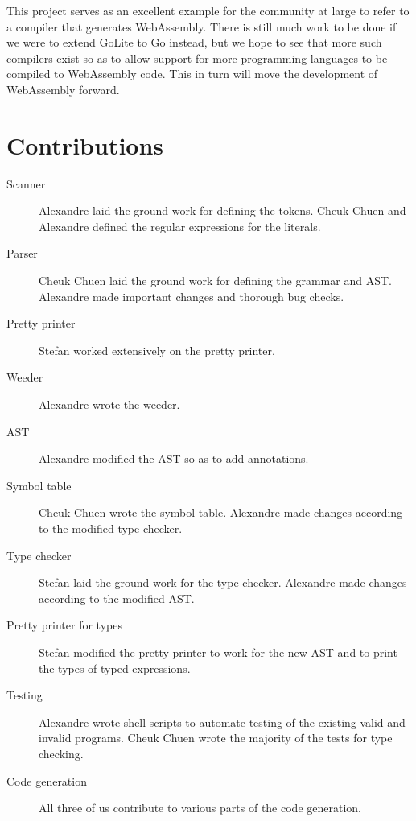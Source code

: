 \documentclass{article}
\begin{document}
This project serves as an excellent example for the community at large to refer to a compiler that generates WebAssembly. There is still much work to be done if we were to extend GoLite to Go instead, but we hope to see that more such compilers exist so as to allow support for more programming languages to be compiled to WebAssembly code. This in turn will move the development of WebAssembly forward.

\section{Contributions}
\begin{description}
  \item [Scanner] Alexandre laid the ground work for defining the tokens. Cheuk Chuen and Alexandre defined the regular expressions for the literals.
  \item [Parser] Cheuk Chuen laid the ground work for defining the grammar and AST. Alexandre made important changes and thorough bug checks.
  \item [Pretty printer] Stefan worked extensively on the pretty printer.
  \item [Weeder] Alexandre wrote the weeder.
  \item [AST] Alexandre modified the AST so as to add annotations.
  \item [Symbol table] Cheuk Chuen wrote the symbol table. Alexandre made changes according to the modified type checker.
  \item [Type checker] Stefan laid the ground work for the type checker. Alexandre made changes according to the modified AST.
  \item [Pretty printer for types] Stefan modified the pretty printer to work for the new AST and to print the types of typed expressions.
  \item [Testing] Alexandre wrote shell scripts to automate testing of the existing valid and invalid programs. Cheuk Chuen wrote the majority of the tests for type checking.
  \item [Code generation] All three of us contribute to various parts of the code generation.
\end{description}
\end{document}
